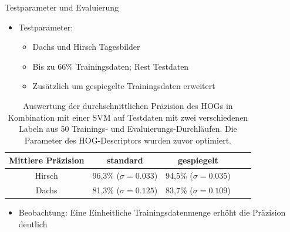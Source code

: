 \begin{frame}[t,fragile]{Testparameter und Evaluierung}
  \begin{itemize}
 	\item Testparameter:
		\begin{itemize}
 			\item Dachs und Hirsch Tagesbilder
			\item Bis zu 66\% Trainingsdaten; Rest Testdaten
			\item Zusätzlich um gespiegelte Trainingsdaten erweitert

 		 \end{itemize}
  \end{itemize}
	\begin{table}
		\begin{tabular}{|c||c|c|c|c|}
			\hline
			Mittlere Präzision & standard & gespiegelt  \\
			\hline
			Hirsch & 96,3\% ($\sigma = 0.033$) & 94,5\% ($\sigma = 0.035$)  \\ 
			\hline
			Dachs & 81,3\% ($\sigma = 0.125$) & 83,7\% ($\sigma = 0.109$) \\
			\hline
		\end{tabular}
	\caption{Auswertung der durchschnittlichen Präzision des HOGs in Kombination mit einer SVM auf Testdaten mit zwei verschiedenen Labeln aus 50 Trainings- und Evaluierungs-Durchläufen. Die Parameter des HOG-Descriptors wurden zuvor optimiert. }
	\end{table}
  \begin{itemize}
 	\item Beobachtung: Eine Einheitliche Trainingsdatenmenge erhöht die Präzision deutlich
  \end{itemize}
\end{frame}


